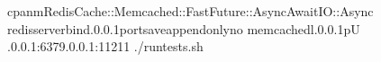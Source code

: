 cpanmRedisCache::Memcached::FastFuture::AsyncAwaitIO::Async
redis\PGZhy{}server\PGZhy{}\PGZhy{}bind.0.0.1\PGZhy{}\PGZhy{}port\PGZhy{}\PGZhy{}save\PGZhy{}\PGZhy{}appendonlyno
memcached\PGZhy{}l.0.0.1\PGZhy{}p\PGZhy{}U
.0.0.1:6379.0.0.1:11211
./run\PGZhy{}tests.sh
